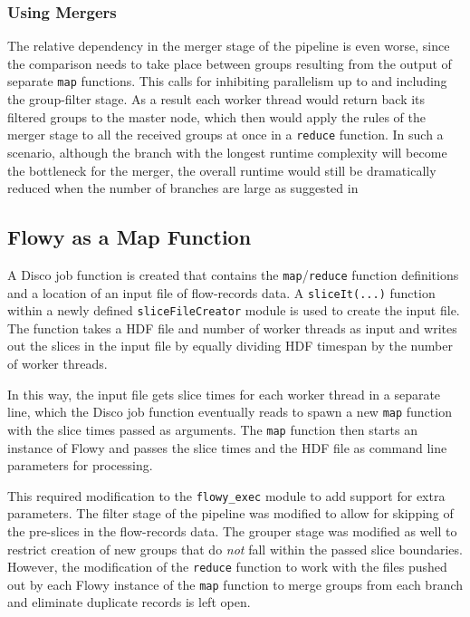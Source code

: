 \subsubsection{Using Mergers}\label{subsec:using-mergers}
The relative dependency in the merger stage of the pipeline is even worse, since the comparison needs to take place between groups resulting from the output of separate \texttt{map} functions. This calls for inhibiting parallelism up to and including the group-filter stage. As a result each worker thread would return back its filtered groups to the master node, which then would apply the rules of the merger stage to all the received groups at once in a \texttt{reduce} function. In such a scenario, although the branch with the longest runtime complexity will become the bottleneck for the merger, the overall runtime would still be dramatically reduced when the number of branches are large as suggested in \cite{jschauer:2012}

\subsection{Flowy as a Map Function}\label{subsec:flowy-map}
A Disco job function is created that contains the \texttt{map}/\texttt{reduce} function definitions and a location of an input file of flow-records data. A \texttt{sliceIt(...)} function within a newly defined \texttt{sliceFileCreator} module is used to create the input file. The function takes a \ac{HDF} file and number of worker threads as input and writes out the slices in the input file by equally dividing \ac{HDF} timespan by the number of worker threads. 

In this way, the input file gets slice times for each worker thread in a separate line, which the Disco job function eventually reads to spawn a new \texttt{map} function with the slice times passed as arguments. The \texttt{map} function then starts an instance of Flowy and passes the slice times and the \ac{HDF} file as command line parameters for processing. 

This required modification to the \texttt{flowy\_exec} module to add support for extra parameters. The filter stage of the pipeline was modified to allow for skipping of the pre-slices in the flow-records data. The grouper stage was modified as well to restrict creation of new groups that do \emph{not} fall within the passed slice boundaries. However, the modification of the \texttt{reduce} function to work with the files pushed out by each Flowy instance of the \texttt{map} function to merge groups from each branch and eliminate duplicate records is left open. 
